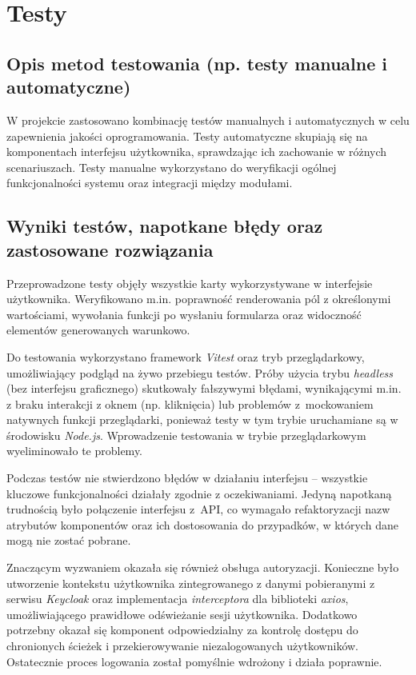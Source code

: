 \documentclass[../../spr.tex]{subfiles}
\begin{document}
\section{Testy}
\subsection{Opis metod testowania (np. testy manualne i automatyczne)}
W projekcie zastosowano kombinację testów manualnych i automatycznych w celu zapewnienia jakości oprogramowania. Testy automatyczne skupiają się na komponentach interfejsu użytkownika, sprawdzając ich zachowanie w różnych scenariuszach. Testy manualne wykorzystano do weryfikacji ogólnej funkcjonalności systemu oraz integracji między modułami.

\subsection{Wyniki testów, napotkane błędy oraz zastosowane rozwiązania}

Przeprowadzone testy objęły wszystkie karty wykorzystywane w interfejsie użytkownika. Weryfikowano m.in. poprawność renderowania pól z określonymi wartościami, wywołania funkcji po wysłaniu formularza oraz widoczność elementów generowanych warunkowo.

Do testowania wykorzystano framework \textit{Vitest} oraz tryb przeglądarkowy, umożliwiający podgląd na żywo przebiegu testów. Próby użycia trybu \textit{headless} (bez interfejsu graficznego) skutkowały fałszywymi błędami, wynikającymi m.in. z braku interakcji z oknem (np. kliknięcia) lub problemów z~mockowaniem natywnych funkcji przeglądarki, ponieważ testy w tym trybie uruchamiane są w środowisku \textit{Node.js}. Wprowadzenie testowania w trybie przeglądarkowym wyeliminowało te problemy.

Podczas testów nie stwierdzono błędów w działaniu interfejsu – wszystkie kluczowe funkcjonalności działały zgodnie z oczekiwaniami. Jedyną napotkaną trudnością było połączenie interfejsu z~API, co wymagało refaktoryzacji nazw atrybutów komponentów oraz ich dostosowania do przypadków, w których dane mogą nie zostać pobrane. 

Znaczącym wyzwaniem okazała się również obsługa autoryzacji. Konieczne było utworzenie kontekstu użytkownika zintegrowanego z danymi pobieranymi z serwisu \textit{Keycloak} oraz implementacja \textit{interceptora} dla biblioteki \textit{axios}, umożliwiającego prawidłowe odświeżanie sesji użytkownika. Dodatkowo potrzebny okazał się komponent odpowiedzialny za kontrolę dostępu do chronionych ścieżek i przekierowywanie niezalogowanych użytkowników. Ostatecznie proces logowania został pomyślnie wdrożony i działa poprawnie.
\end{document}
